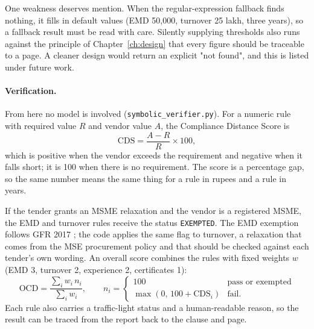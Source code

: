 One weakness deserves mention. When the regular-expression fallback finds nothing, it fills in default values (EMD 50{,}000, turnover 25 lakh, three years), so a fallback result must be read with care. Silently supplying thresholds also runs against the principle of Chapter~\ref{ch:design} that every figure should be traceable to a page. A cleaner design would return an explicit "not found", and this is listed under future work.

\paragraph{Verification.} From here no model is involved (\texttt{symbolic\_verifier.py}). For a numeric rule with required value $R$ and vendor value $A$, the Compliance Distance Score is
\begin{equation}
\mathrm{CDS}=\frac{A-R}{R}\times 100,
\end{equation}
which is positive when the vendor exceeds the requirement and negative when it falls short; it is 100 when there is no requirement. The score is a percentage gap, so the same number means the same thing for a rule in rupees and a rule in years.

If the tender grants an MSME relaxation and the vendor is a registered MSME, the EMD and turnover rules receive the status \texttt{EXEMPTED}. The EMD exemption follows GFR 2017 \cite{gfr2017}; the code applies the same flag to turnover, a relaxation that comes from the MSE procurement policy and that should be checked against each tender's own wording. An overall score combines the rules with fixed weights $w$ (EMD 3, turnover 2, experience 2, certificates 1):
\begin{equation}
\mathrm{OCD}=\frac{\sum_i w_i\,n_i}{\sum_i w_i},\qquad
n_i=\begin{cases}100 & \text{pass or exempted}\\ \max(0,\,100+\mathrm{CDS}_i) & \text{fail.}\end{cases}
\end{equation}
Each rule also carries a traffic-light status and a human-readable reason, so the result can be traced from the report back to the clause and page.

